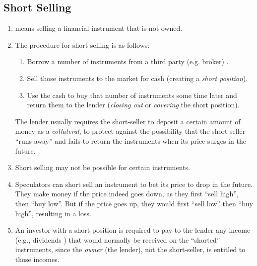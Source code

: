 \subsection{Short Selling}
\begin{enumerate}
\item {} means selling a financial instrument 
that is not owned.
\item The procedure for short selling is as follows:
\begin{enumerate}
\item Borrow a number of instruments  from a third party (e.g.
broker) .

\item Sell those instruments  to the market 
for cash  (creating a \emph{short position}).

\item Use the cash  to buy that number of instruments
 some time later  and return them to the lender
 (\emph{closing out} or \emph{covering} the short position).
\end{enumerate}
\begin{note}
The lender  usually requires the short-seller to deposit a
certain amount of money as a \emph{collateral}, to protect against the
possibility that the short-seller ``runs away''  and fails to
return the instruments  when its price surges in the future.
\end{note}

\item Short selling may not be possible for certain instruments.

\item Speculators can short sell an instrument  to
bet  its price to drop {\color{red}} in the
future. They make money if the price indeed goes down, as they first ``sell
high'', then ``buy low''. But if the price goes up, they would first ``sell
low'' then ``buy high'', resulting in a loss.

\item An investor with a short position is required to pay to the lender
 any income (e.g., dividends ) that
would normally be received on the ``shorted'' instruments, since the \emph{owner}
(the lender), not the short-seller, is entitled to those incomes.
\end{enumerate}

